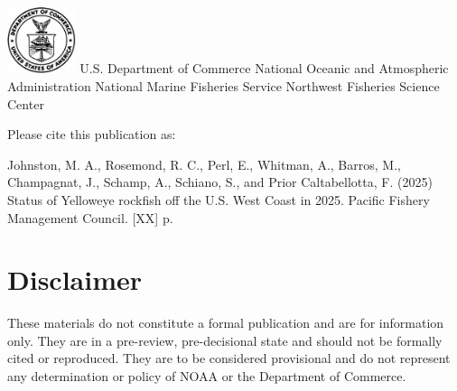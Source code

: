 \documentclass[
]{scrartcl}
\renewcommand*\contentsname{Table of contents}
\newcommand\contentsname{Table of contents}
\begin{document}
\begin{titlepage}
\begin{minipage}[b][\textheight][s]{\textwidth}
  \includegraphics[alt={},width=2cm]{support_files/us_doc_logo.png}\newline %
  U.S. Department of Commerce\newline
  National Oceanic and Atmospheric Administration\newline
  National Marine Fisheries Service\newline
  Northwest Fisheries Science Center\newline

  \end{minipage}
  \restoregeometry
  \end{titlepage}

\renewcommand*\contentsname{Table of contents}
{
\hypersetup{linkcolor=}
\setcounter{tocdepth}{3}
\tableofcontents
}

\setcounter{page}{1}

\renewcommand{\thetable}{\roman{table}}
\renewcommand{\thefigure}{\roman{figure}}

\newpage{}

Please cite this publication as:

Johnston, M. A., Rosemond, R. C., Perl, E., Whitman, A., Barros, M.,
Champagnat, J., Schamp, A., Schiano, S., and Prior Caltabellotta, F.
(2025) Status of Yelloweye rockfish off the U.S. West Coast in 2025.
Pacific Fishery Management Council. {[}XX{]} p.

\newpage{}

\setcounter{page}{1}

\renewcommand{\thetable}{\roman{table}}
\renewcommand{\thefigure}{\roman{figure}}

\section*{Disclaimer}\label{disclaimer}

These materials do not constitute a formal publication and are for
information only. They are in a pre-review, pre-decisional state and
should not be formally cited or reproduced. They are to be considered
provisional and do not represent any determination or policy of NOAA or
the Department of Commerce.
\end{document}

